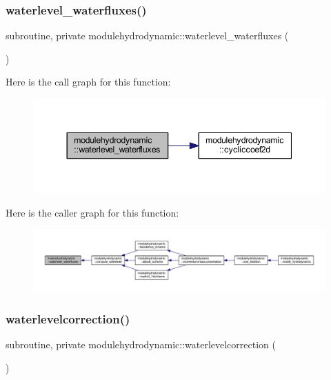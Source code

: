 \subsubsection{\texorpdfstring{waterlevel\+\_\+waterfluxes()}{waterlevel\_waterfluxes()}}
{\footnotesize\ttfamily subroutine, private modulehydrodynamic\+::waterlevel\+\_\+waterfluxes (\begin{DoxyParamCaption}{ }\end{DoxyParamCaption})\hspace{0.3cm}{\ttfamily [private]}}

Here is the call graph for this function\+:\nopagebreak
\begin{figure}[H]
\begin{center}
\leavevmode
\includegraphics[width=344pt]{namespacemodulehydrodynamic_a592aa79c419a6f5815c5df5a4b4548a9_cgraph}
\end{center}
\end{figure}
Here is the caller graph for this function\+:\nopagebreak
\begin{figure}[H]
\begin{center}
\leavevmode
\includegraphics[width=350pt]{namespacemodulehydrodynamic_a592aa79c419a6f5815c5df5a4b4548a9_icgraph}
\end{center}
\end{figure}
\mbox{\label{namespacemodulehydrodynamic_a1adc02badc9c5130d372cfb28e43f796}} 
\subsubsection{\texorpdfstring{waterlevelcorrection()}{waterlevelcorrection()}}
{\footnotesize\ttfamily subroutine, private modulehydrodynamic\+::waterlevelcorrection (\begin{DoxyParamCaption}{ }\end{DoxyParamCaption})\hspace{0.3cm}{\ttfamily [private]}}

